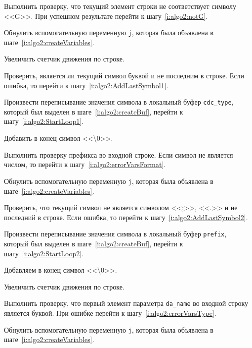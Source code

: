 \begin{enumerate_step}
    \item \label{i:algo2:GSearch} Выполнить проверку, что текущий элемент строки не соответствует символу <<G>>. При успешном результате перейти к шагу~\ref{i:algo2:notG}.
    \item Обнулить вспомогательную переменную \lstinline{j}, которая была объявлена в шаге~\ref{i:algo2:createVariables}.
    \item Увеличить счетчик движения по строке.
    \item \label{i:algo2:StartLoop1} Проверить, является ли текущий символ буквой и не последним в строке. Если ошибка, то перейти к шагу~\ref{i:algo2:AddLastSymbol1}.
    \item Произвести переписывание значения символа в локальный буфер \lstinline{cdc_type}, который был выделен в шаге~\ref{i:algo2:createBuf}, перейти к шагу~\ref{i:algo2:StartLoop1}.
    \item \label{i:algo2:AddLastSymbol1} Добавить в конец символ <<\textbackslash 0>>.
    \item Выполнить проверку префикса во входной строке. Если символ не является числом, то перейти к шагу~\ref{i:algo2:errorVarsFormat}.
    \item Обнулить вспомогательную переменную \lstinline{j}, которая была объявлена в шаге~\ref{i:algo2:createVariables}.
    \item \label{i:algo2:StartLoop2} Проверить, что текущий символ не является символом <<;>>,
    <<.>> и не последний в строке. Если ошибка, то перейти к шагу~\ref{i:algo2:AddLastSymbol2}.
    \item Произвести переписывание значения символа в локальный буфер \lstinline{prefix}, который был выделен в шаге~\ref{i:algo2:createBuf}, перейти к шагу~\ref{i:algo2:StartLoop2}.
    \item \label{i:algo2:AddLastSymbol2} Добавляем в конец символ <<\textbackslash 0>>.
    \item Увеличить счетчик движения по строке.
    \item Выполнить проверку, что первый элемент параметра \lstinline{da_name} во входной строку является буквой. При ошибке перейти к шагу~\ref{i:algo2:errorVarsType}.
    \item Обнулить вспомогательную переменную \lstinline{j}, которая была объявлена в шаге~\ref{i:algo2:createVariables}.


\end{enumerate_step}

